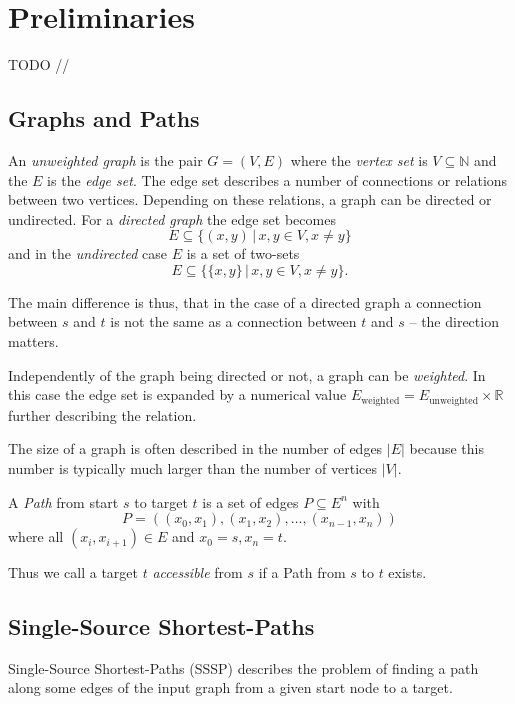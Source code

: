 
\section{Preliminaries}
TODO //

\subsection{Graphs and Paths}
An \emph{unweighted graph} is the pair $G=(V,E)$ where the \emph{vertex set} is $V\subseteq\mathbb N$ and the $E$ is the \emph{edge set}.
The edge set describes a number of connections or relations between two vertices. Depending on these relations, a graph can be directed or undirected. For a \emph{directed graph} the edge set becomes 
\begin{equation*}
  E\subseteq\{(x,y)\,|\, x,y\in V, x\neq y\}
\end{equation*}
and in the \emph{undirected} case $E$ is a set of two-sets 
\begin{equation*}
  E\subseteq\{\{x,y\}\,|\, x,y\in V, x\neq y\}.
\end{equation*}

The main difference is thus, that in the case of a directed graph a connection between $s$ and $t$ is not the same as a connection between $t$ and $s$ -- the direction matters.

Independently of the graph being directed or not, a graph can be \emph{weighted}. In this case the edge set is expanded by a numerical value $E_{\text{weighted}}=E_{\text{unweighted}}\times \mathbb R$ further describing the relation.

The size of a graph is often described in the number of edges $|E|$ because this number is typically much larger than the number of vertices $|V|$.

A \emph{Path} from start $s$ to target $t$ is a set of edges $P\subseteq E^n$ with
\begin{equation*}
   P=((x_0,x_1),(x_1,x_2),\ldots, (x_{n-1},x_n))
\end{equation*}
where all $(x_i,x_{i+1})\in E$ and $x_0=s, x_n=t$.

Thus we call a target $t$ \emph{accessible} from $s$ if a Path from $s$ to $t$ exists.

\subsection{Single-Source Shortest-Paths}
Single-Source Shortest-Paths (SSSP) describes the problem of finding a path along some edges of the input graph from a given start node to a target.

